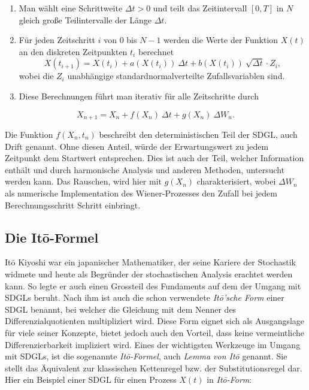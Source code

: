 \begin{enumerate}
	\item Man wählt eine Schrittweite $ \Delta t > 0 $ und teilt das Zeitintervall $ [0, T] $ in $ N $ gleich große Teilintervalle der Länge $ \Delta t $.
	\item Für jeden Zeitschritt $ i $ von $ 0 $ bis $ N-1 $ werden die Werte der Funktion $ X(t) $ an den diskreten Zeitpunkten $ t_i $ berechnet
	\begin{equation}
		X(t_{i+1}) = X(t_i) + a(X(t_i)) \ \Delta t + b(X(t_i)) \ \sqrt{\Delta t} \cdot Z_i,
	\end{equation}
	wobei die $ Z_i $ unabhängige standardnormalverteilte Zufallsvariablen sind.
	\item Diese Berechnungen führt man iterativ für alle Zeitschritte durch
\end{enumerate}

\begin{equation}
	X_{n+1} = X_n + f(X_n) \ \Delta t + g(X_n) \ \Delta W_n .
\end{equation}

Die Funktion $ f(X_n,t_n) $ beschreibt den deterministischen Teil der SDGL, auch Drift genannt. Ohne diesen Anteil, würde der Erwartungswert zu jedem Zeitpunkt dem Startwert entsprechen. Dies ist auch der Teil, welcher Information enthält und durch harmonische Analysis und anderen Methoden, untersucht werden kann. Das Rauschen, wird hier mit $ g(X_n) $ charakterisiert, wobei $ \Delta W_n $ als numerische Implementation des Wiener-Prozesses den Zufall bei jedem Berechnungsschritt Schritt einbringt.



\subsection{Die Itō-Formel\label{brown:ito}}

Itō Kiyoshi war ein japanischer Mathematiker, der seine Kariere der Stochastik widmete und heute als Begründer der stochastischen Analysis erachtet werden kann. So legte er auch einen Grossteil des Fundaments auf dem der Umgang mit SDGLs beruht. Nach ihm ist auch die schon verwendete \textit{Itō'sche Form} einer SDGL benannt, bei welcher die Gleichung mit dem Nenner des Differenzialquotienten multipliziert wird. Diese Form eignet sich als Ausgangslage für viele seiner Konzepte, bietet jedoch auch den Vorteil, dass keine vermeintliche Differenzierbarkeit impliziert wird.
Eines der wichtigsten Werkzeuge im Umgang mit SDGLs, ist die sogenannte \textit{Itō-Formel}, auch \textit{Lemma von Itō} genannt. Sie stellt das Äquivalent zur klassischen Kettenregel bzw. der Substitutionsregel dar. Hier ein Beispiel einer SDGL für einen Prozess $ X(t) $ in \textit{Itō-Form}:

